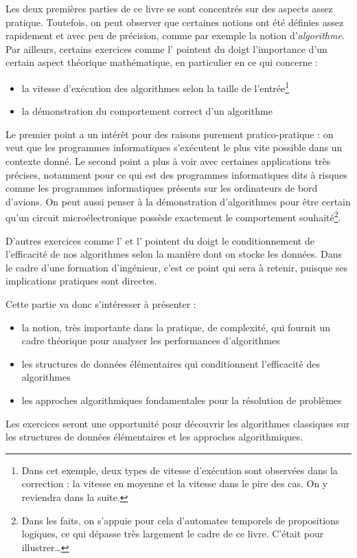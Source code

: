 \documentclass[../../main.tex]{subfiles}
\begin{document}
Les deux premières parties de ce livre se sont concentrés sur des aspects assez pratique. Toutefois, on peut observer que certaines notions ont été définies assez rapidement et avec peu de précision, comme par exemple la notion d'\textit{algorithme}. Par ailleurs, certains exercices comme l' pointent du doigt l'importance d'un certain aspect théorique mathématique, en particulier en ce qui concerne :
\begin{itemize}
	\item la vitesse d'exécution des algorithmes selon la taille de l'entrée\footnote{Dans cet exemple, deux types de vitesse d'exécution sont observées dans la correction : la vitesse en moyenne et la vitesse dans le pire des cas. On y reviendra dans la suite.}
	\item la démonstration du comportement correct d'un algorithme
\end{itemize}
Le premier point a un intérêt pour des raisons purement pratico-pratique : on veut que les programmes informatiques s'exécutent le plus vite possible dans un contexte donné. Le second point a plus à voir avec certaines applications très précises, notamment pour ce qui est des programmes informatiques dits \og à risques \fg comme les programmes informatiques présents sur les ordinateurs de bord d'avions. On peut aussi penser à la démonstration d'algorithmes pour être certain qu'un circuit microélectronique possède exactement le comportement souhaité\footnote{Dans les faits, on s'appuie pour cela d'automates temporels de propositions logiques, ce qui dépasse très largement le cadre de ce livre. C'était pour illustrer\dots}.

D'autres exercices comme l' et l' pointent du doigt le conditionnement de l'efficacité de nos algorithmes selon la manière dont on stocke les données. Dans le cadre d'une formation d'ingénieur, c'est ce point qui sera à retenir, puisque ses implications pratiques sont directes.

Cette partie va donc s'intéresser à présenter :
\begin{itemize}
	\item la notion, très importante dans la pratique, de complexité, qui fournit un cadre théorique pour analyser les performances d'algorithmes
	\item les structures de données élémentaires qui conditionnent l'efficacité des algorithmes
	\item les approches algorithmiques fondamentales pour la résolution de problèmes
\end{itemize}
Les exercices seront une opportunité pour découvrir les algorithmes classiques sur les structures de données élémentaires et les approches algorithmiques.
\end{document}
